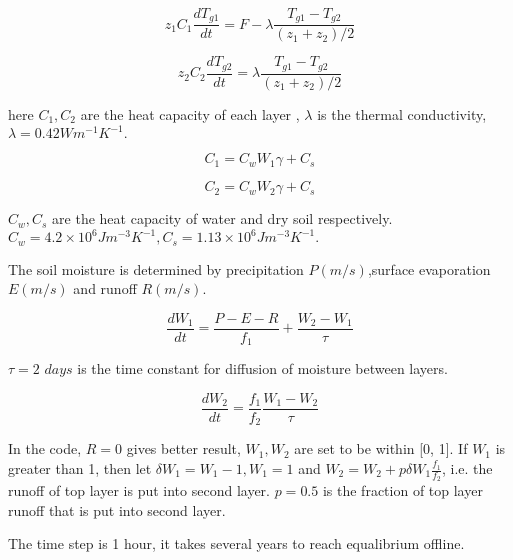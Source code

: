 \begin{equation}
z_{1}C_{1}\frac{dT_{g1}}{dt}=F-\lambda \frac{T_{g1}-T_{g2}}{(z_{1}+z_{2})/2}
\end{equation}

\begin{center}
\begin{equation}
z_{2}C_{2}\frac{dT_{g2}}{dt}=\lambda \frac{T_{g1}-T_{g2}}{(z_{1}+z_{2})/2}
\end{equation}
\end{center}

here $C_{1},C_{2}$ are the heat capacity of each layer , $\lambda $ is the
thermal conductivity, $\lambda =0.42Wm^{-1}K^{-1}.$

\begin{center}
\bigskip 
\begin{equation}
C_{1}=C_{w}W_{1}\gamma +C_{s}
\end{equation}

\begin{equation}
C_{2}=C_{w}W_{2}\gamma +C_{s}
\end{equation}
\end{center}

$C_{w},C_{s}$ are the heat capacity of water and dry soil respectively. $%
C_{w}=4.2\times 10^{6}Jm^{-3}K^{-1},C_{s}=1.13\times 10^{6}Jm^{-3}K^{-1}.$

\bigskip

The soil moisture is determined by precipitation $P(m/s)$,surface
evaporation $E(m/s)$ and runoff $R(m/s).$

\begin{equation}
\frac{dW_{1}}{dt}=\frac{P-E-R}{f_{1}}+\frac{W_{2}-W_{1}}{\tau }
\end{equation}

$\tau =2$ $days$ is the time constant for diffusion of moisture between
layers.

\begin{equation}
\frac{dW_{2}}{dt}=\frac{f_{1}}{f_{2}}\frac{W_{1}-W_{2}}{\tau }
\end{equation}

In the code, $R=0$ gives better result, $W_{1},W_{2}$ are set to be within
[0, 1]. If $W_{1}$ is greater than 1, then let $\delta W_{1}=W_{1}-1,W_{1}=1$
and $W_{2}=W_{2}+p\delta W_{1}\frac{f_{1}}{f_{2}}$, i.e. the runoff of top
layer is put into second layer. $p=0.5$ is the fraction of top layer runoff
that is put into second layer.

The time step is 1 hour, it takes several years to reach equalibrium offline.


